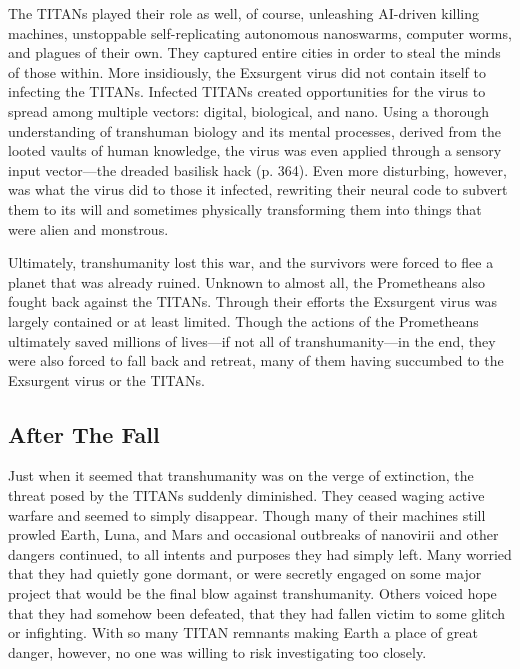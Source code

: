 The TITANs played their role as well, of course, 
unleashing AI-driven killing machines, unstoppable 
self-replicating autonomous nanoswarms, computer 
worms, and plagues of their own. They captured 
entire cities in order to steal the minds of those within. 
More insidiously, the Exsurgent virus did not contain
itself to infecting the TITANs. Infected TITANs
created opportunities for the virus to spread among 
multiple vectors: digital, biological, and nano. Using a 
thorough understanding of transhuman biology and 
its mental processes, derived from the looted vaults 
of human knowledge, the virus was even applied 
through a sensory input vector—the dreaded basilisk 
hack (p. 364). Even more disturbing, however, was 
what the virus did to those it infected, rewriting their 
neural code to subvert them to its will and sometimes 
physically transforming them into things that were 
alien and monstrous.

Ultimately, transhumanity lost this war, and the 
survivors were forced to flee a planet that was already 
ruined. Unknown to almost all, the Prometheans also 
fought back against the TITANs. Through their efforts
the Exsurgent virus was largely contained or at
least limited. Though the actions of the Prometheans 
ultimately saved millions of lives—if not all of transhumanity—in
the end, they were also forced to fall
back and retreat, many of them having succumbed to 
the Exsurgent virus or the TITANs. 

\subsection{After The Fall}

Just when it seemed that transhumanity was on the 
verge of extinction, the threat posed by the TITANs 
suddenly diminished. They ceased waging active warfare
and seemed to simply disappear. Though many of
their machines still prowled Earth, Luna, and Mars and 
occasional outbreaks of nanovirii and other dangers 
continued, to all intents and purposes they had simply 
left. Many worried that they had quietly gone dormant, 
or were secretly engaged on some major project that 
would be the final blow against transhumanity. Others 
voiced hope that they had somehow been defeated, 
that they had fallen victim to some glitch or infighting. 
With so many TITAN remnants making Earth a place 
of great danger, however, no one was willing to risk 
investigating too closely.

